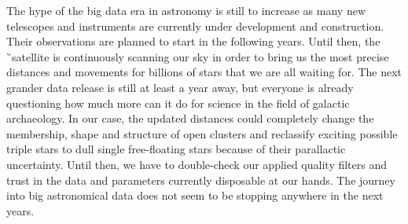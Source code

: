 The hype of the big data era in astronomy is still to increase as many new telescopes and instruments are currently under development and construction. Their observations are planned to start in the following years. Until then, the \G\ satellite is continuously scanning our sky in order to bring us the most precise distances and movements for billions of stars that we are all waiting for. The next grander data release is still at least a year away, but everyone is already questioning how much more can it do for science in the field of galactic archaeology. In our case, the updated distances could completely change the membership, shape and structure of open clusters and reclassify exciting possible triple stars to dull single free-floating stars because of their parallactic uncertainty. Until then, we have to double-check our applied quality filters and trust in the data and parameters currently disposable at our hands. The journey into big astronomical data does not seem to be stopping anywhere in the next years.